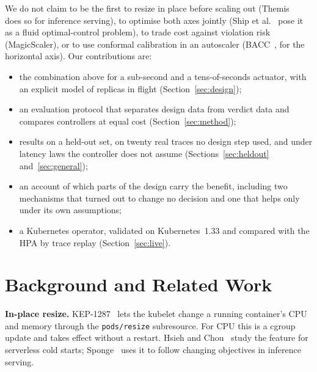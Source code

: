 \documentclass[conference]{IEEEtran}
\begin{document}
We do not claim to be the first to resize in place before scaling out (Themis~\cite{themis}
does so for inference serving), to optimise both axes jointly (Ship et al.~\cite{ship}
pose it as a fluid optimal-control problem), to trade cost against violation risk
(MagicScaler), or to use conformal calibration in an autoscaler (BACC~\cite{bacc}, for the
horizontal axis). Our contributions are:
\begin{itemize}
\item the combination above for a sub-second and a tens-of-seconds actuator, with an
explicit model of replicas in flight (Section~\ref{sec:design});
\item an evaluation protocol that separates design data from verdict data and compares
controllers at equal cost (Section~\ref{sec:method});
\item results on a held-out set, on twenty real traces no design step used, and under
latency laws the controller does not assume (Sections~\ref{sec:heldout}
and~\ref{sec:general});
\item an account of which parts of the design carry the benefit, including two mechanisms
that turned out to change no decision and one that helps only under its own assumptions;
\item a Kubernetes operator, validated on Kubernetes~1.33 and compared with the HPA by
trace replay (Section~\ref{sec:live}).
\end{itemize}

\section{Background and Related Work}

\textbf{In-place resize.} KEP-1287~\cite{kep1287} lets the kubelet change a running
container's CPU and memory through the \texttt{pods/resize} subresource. For CPU this is a
cgroup update and takes effect without a restart. Hsieh and Chou~\cite{hsieh} study the
feature for serverless cold starts; Sponge~\cite{sponge} uses it to follow changing
objectives in inference serving.
\end{document}
